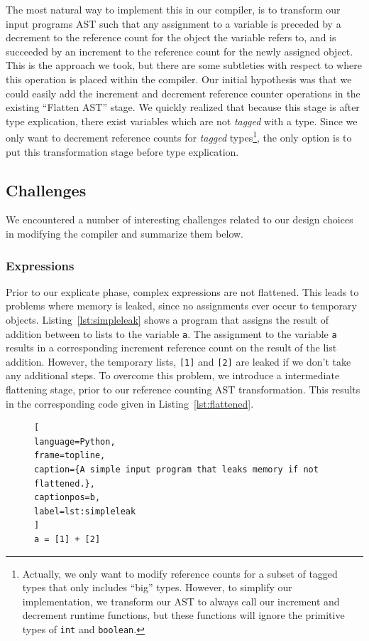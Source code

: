 \documentclass{sigplanconf}
\begin{document}
The most natural way to implement this in our compiler, is to transform our input programs AST such that any assignment to a variable is preceded by a decrement to the reference count for the object the variable refers to, and is succeeded by an increment to the reference count for the newly assigned object.  This is the approach we took, but there are some subtleties with respect to where this operation is placed within the compiler.  Our initial hypothesis was that we could easily add the increment and decrement reference counter operations in the existing ``Flatten AST'' stage.  We quickly realized that because this stage is after type explication, there exist variables which are not \textit{tagged} with a type.  Since we only want to decrement reference counts for \textit{tagged} types\footnote{Actually, we only want to modify reference counts for a subset of tagged types that only includes ``big'' types. However, to simplify our implementation, we transform our AST to always call our increment and decrement runtime functions, but these functions will ignore the primitive types of \texttt{int} and \texttt{boolean}.}, the only option is to put this transformation stage before type explication.  

\subsection{Challenges}
We encountered a number of interesting challenges related to our design choices in modifying the compiler and summarize them below.

\subsubsection{Expressions}
Prior to our explicate phase, complex expressions are not flattened.  This leads to problems where memory is leaked, since no assignments ever occur to temporary objects.  Listing~\ref{lst:simpleleak} shows a program that assigns the result of addition between to lists to the variable \texttt{a}.  The assignment to the variable \texttt{a} results in a corresponding increment reference count on the result of the list addition.  However, the temporary lists, \texttt{[1]} and \texttt{[2]} are leaked if we don't take any additional steps.  To overcome this problem, we introduce a intermediate flattening stage, prior to our reference counting AST transformation.   This results in the corresponding code given in Listing~\ref{lst:flattened}.

\begin{figure}[h!]
\begin{lstlisting}[
language=Python,
frame=topline,
caption={A simple input program that leaks memory if not flattened.},
captionpos=b,
label=lst:simpleleak
]
a = [1] + [2]
\end{lstlisting}
\end{figure}
\end{document}
